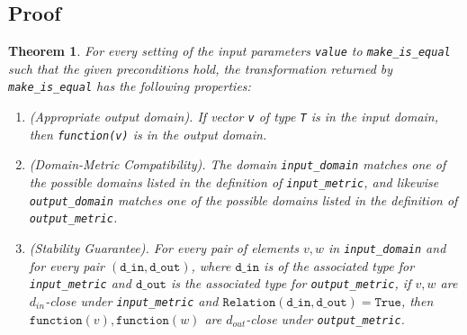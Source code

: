 \documentclass[11pt,a4paper]{article}
\newtheorem{theorem}{Theorem}[section]
\newcommand{\din}{\texttt{d\_in}}
\newcommand{\dout}{\texttt{d\_out}}
\newcommand{\Relation}{\texttt{Relation}}
\newcommand{\True}{\texttt{True}}
\newcommand{\function}{\texttt{function}}
\begin{document}
\subsection{Proof}
\begin{theorem}


For every setting of the input parameters \texttt{value} to \texttt{make\_is\_equal} such that the given preconditions hold, the transformation returned by \texttt{make\_is\_equal} has the following properties:
\begin{enumerate}
    \item \textup{(Appropriate output domain).} If vector \texttt{v} of type \texttt{T} is in the input domain, then \texttt{function(v)} is in the output domain.
    \item \textup{(Domain-Metric Compatibility).} The domain \texttt{input\_domain} matches one of the possible domains listed in the definition of \texttt{input\_metric}, and likewise \texttt{output\_domain} matches one of the possible domains listed in the definition of \texttt{output\_metric}.
    \item \textup{(Stability Guarantee).} For every pair of elements $v, w$ in \texttt{input\_domain} and for every pair $(\din, \dout)$, where $\din$ is of the associated type for \texttt{input\_metric} and $\dout$ is the associated type for \texttt{output\_metric}, if $v,w$ are $d_{in}$-close under \texttt{input\_metric} and $\Relation(\din, \dout) = \True$, then $\function(v), \function(w)$ are $d_{out}$-close under \texttt{output\_metric}.
\end{enumerate}
\end{theorem}
\end{document}
